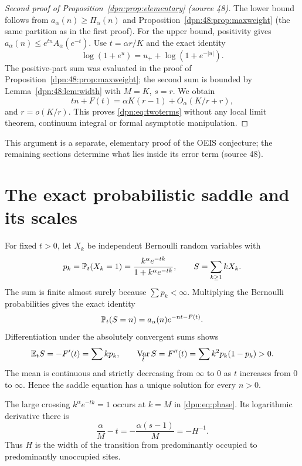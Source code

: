 \documentclass[11pt]{article}
\numberwithin{equation}{section}
\theoremstyle{definition}\newtheorem{definition}[theorem]{Definition}
\theoremstyle{remark}\newtheorem{remark}[theorem]{Remark}
\DeclareMathOperator{\Var}{Var}
\newcommand{\src}[1]{\textup{(source #1)}}
\begin{document}
\begin{proof}[Second proof of Proposition~\ref{dpn:prop:elementary} \src{48}]
The lower bound follows from $a_\alpha(n)\ge\Pi_\alpha(n)$ and
Proposition~\ref{dpn:48:prop:maxweight} (the same partition as in the first
proof). For the upper bound, positivity gives
$a_\alpha(n)\le e^{tn}A_\alpha(e^{-t})$. Use $t=\alpha r/K$ and the exact
identity
\[
 \log(1+e^u)=u_++\log(1+e^{-|u|}).
\]
The positive-part sum was evaluated in the proof of
Proposition~\ref{dpn:48:prop:maxweight}; the second sum is bounded by
Lemma~\ref{dpn:48:lem:width} with $M=K$, $s=r$. We obtain
\[
 tn+F(t)=\alpha K(r-1)+O_\alpha(K/r+r),
\]
and $r=o(K/r)$. This proves \eqref{dpn:eq:twoterms} without any local limit
theorem, continuum integral or formal asymptotic manipulation.
\end{proof}
This argument is a separate, elementary proof of the OEIS conjecture; the
remaining sections determine what lies inside its error term \src{48}.

\section{The exact probabilistic saddle and its scales}\label{dpn:sec:saddle}
For fixed $t>0$, let $X_k$ be independent Bernoulli random variables with
\begin{equation}\label{dpn:eq:pk}
 p_k=\mathbb P_t(X_k=1)=\frac{k^\alpha e^{-tk}}{1+k^\alpha e^{-tk}},
 \qquad S=\sum_{k\ge1}kX_k.
\end{equation}
The sum is finite almost surely because $\sum p_k<\infty$. Multiplying the
Bernoulli probabilities gives the exact identity
\begin{equation}\label{dpn:eq:tiltidentity}
 \mathbb P_t(S=n)=a_\alpha(n)e^{-nt-F(t)}.
\end{equation}
Differentiation under the absolutely convergent sums shows
\[
 \E_tS=-F'(t)=\sum k p_k,\qquad
 \Var_t S=F''(t)=\sum k^2p_k(1-p_k)>0.
\]
The mean is continuous and strictly decreasing from $\infty$ to $0$ as $t$
increases from $0$ to $\infty$. Hence the saddle equation has a unique solution
for every $n>0$.

The large crossing $k^\alpha e^{-tk}=1$ occurs at $k=M$ in
\eqref{dpn:eq:phase}. Its logarithmic derivative there is
\[
 \frac\alpha M-t=-\frac{\alpha(s-1)}M=-H^{-1}.
\]
Thus $H$ is the width of the transition from predominantly occupied to
predominantly unoccupied sites.
\end{document}
